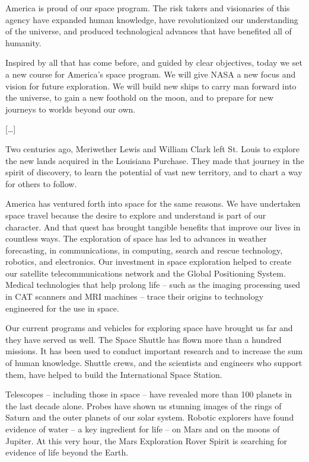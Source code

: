 \documentclass[11pt,a4paper]{article}
\begin{document}
America is proud of our space program. The risk takers and visionaries of this agency have expanded human knowledge, have revolutionized our understanding of the universe, and produced technological advances that have benefited all of humanity.

Inspired by all that has come before, and guided by clear objectives, today we set a new course for America’s space program. We will give NASA a new focus and vision for future exploration. We will build new ships to carry man forward into the universe, to gain a new foothold on the moon, and to prepare for new journeys to worlds beyond our own.

[…]

Two centuries ago, Meriwether Lewis and William Clark left St. Louis to explore the new lands acquired in the Louisiana Purchase. They made that journey in the spirit of discovery, to learn the potential of vast new territory, and to chart a way for others to follow.

America has ventured forth into space for the same reasons. We have undertaken space travel because the desire to explore and understand is part of our character. And that quest has brought tangible benefits that improve our lives in countless ways. The exploration of space has led to advances in weather forecasting, in communications, in computing, search and rescue technology, robotics, and electronics. Our investment in space exploration helped to create our satellite telecommunications network and the Global Positioning System. Medical technologies that help prolong life – such as the imaging processing used in CAT scanners and MRI machines – trace their origins to technology engineered for the use in space.

Our current programs and vehicles for exploring space have brought us far and they have served us well. The Space Shuttle has flown more than a hundred missions. It has been used to conduct important research and to increase the sum of human knowledge. Shuttle crews, and the scientists and engineers who support them, have helped to build the International Space Station.

Telescopes – including those in space – have revealed more than 100 planets in the last decade alone. Probes have shown us stunning images of the rings of Saturn and the outer planets of our solar system. Robotic explorers have found evidence of water – a key ingredient for life – on Mars and on the moons of Jupiter. At this very hour, the Mars Exploration Rover Spirit is searching for evidence of life beyond the Earth.
\end{document}
